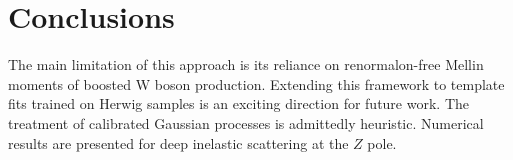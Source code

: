 \section{Conclusions}\label{sec:conclusions}

The main limitation of this approach is its reliance on renormalon-free
Mellin moments of boosted W boson production. Extending this framework
to template fits trained on Herwig samples is an exciting direction for
future work. The treatment of calibrated Gaussian processes is
admittedly heuristic. Numerical results are presented for deep inelastic
scattering at the $Z$ pole.

